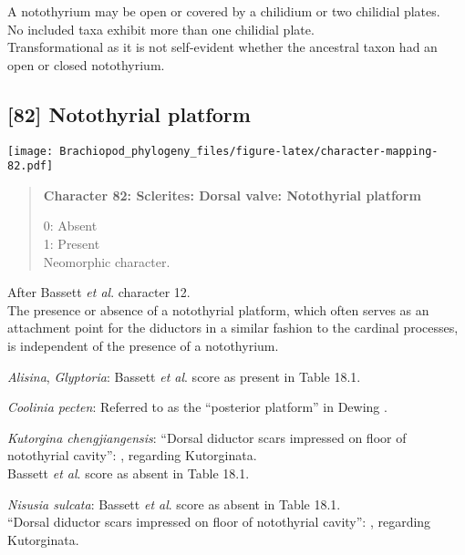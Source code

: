 \documentclass[openany]{book}
\theoremstyle{definition}
\theoremstyle{definition}
\theoremstyle{definition}
\theoremstyle{remark}
\begin{document}
A notothyrium may be open or covered by a chilidium or two chilidial
plates.\\
No included taxa exhibit more than one chilidial plate.\\
Transformational as it is not self-evident whether the ancestral taxon
had an open or closed notothyrium.

\subsection*{{[}82{]} Notothyrial platform}\label{notothyrial-platform}

\texttt{[image: Brachiopod\_phylogeny\_files/figure-latex/character-mapping-82.pdf]}

\begin{quote}
\textbf{Character 82: Sclerites: Dorsal valve: Notothyrial platform}

0: Absent\\
1: Present\\
Neomorphic character.
\end{quote}

After Bassett \emph{et al}.
\citeyearpar{Bassett2001Functionalmorphology} character 12.\\
The presence or absence of a notothyrial platform, which often serves as
an attachment point for the diductors in a similar fashion to the
cardinal processes, is independent of the presence of a notothyrium.

\hypertarget{Alisina-coding-82}{}
\emph{Alisina}, \emph{Glyptoria}: Bassett \emph{et al}.
\citeyearpar{Bassett2001Functionalmorphology} score as present in Table
18.1.

\hypertarget{Coolinia_pecten-coding-82}{}
\emph{Coolinia pecten}: Referred to as the ``posterior platform'' in
Dewing \citeyearpar{Dewing2001Hingemodifications}.

\hypertarget{Kutorgina_chengjiangensis-coding-82}{}
\emph{Kutorgina chengjiangensis}: ``Dorsal diductor scars impressed on
floor of notothyrial cavity'':
\citet{Williams2000LinguliformeaCraniiformea}, regarding Kutorginata.\\
Bassett \emph{et al}. \citeyearpar{Bassett2001Functionalmorphology}
score as absent in Table 18.1.

\hypertarget{Nisusia_sulcata-coding-82}{}
\emph{Nisusia sulcata}: Bassett \emph{et al}.
\citeyearpar{Bassett2001Functionalmorphology} score as absent in Table
18.1.\\
``Dorsal diductor scars impressed on floor of notothyrial cavity'':
\citet{Williams2000LinguliformeaCraniiformea}, regarding Kutorginata.
\end{document}
